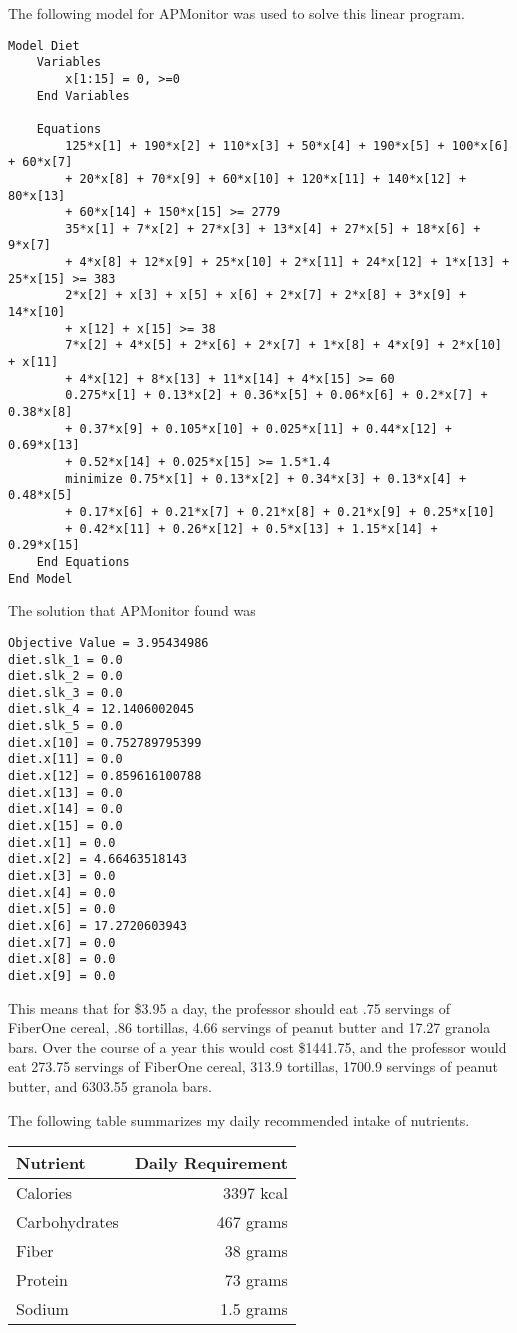 \documentclass[11pt, oneside]{article}
\begin{document}
\noindent The following model for APMonitor was used to solve this linear program.

\begin{verbatim}
Model Diet
    Variables
        x[1:15] = 0, >=0
    End Variables

    Equations
        125*x[1] + 190*x[2] + 110*x[3] + 50*x[4] + 190*x[5] + 100*x[6] + 60*x[7]
        + 20*x[8] + 70*x[9] + 60*x[10] + 120*x[11] + 140*x[12] + 80*x[13]
        + 60*x[14] + 150*x[15] >= 2779
        35*x[1] + 7*x[2] + 27*x[3] + 13*x[4] + 27*x[5] + 18*x[6] + 9*x[7]
        + 4*x[8] + 12*x[9] + 25*x[10] + 2*x[11] + 24*x[12] + 1*x[13] + 25*x[15] >= 383
        2*x[2] + x[3] + x[5] + x[6] + 2*x[7] + 2*x[8] + 3*x[9] + 14*x[10]
        + x[12] + x[15] >= 38
        7*x[2] + 4*x[5] + 2*x[6] + 2*x[7] + 1*x[8] + 4*x[9] + 2*x[10] + x[11]
        + 4*x[12] + 8*x[13] + 11*x[14] + 4*x[15] >= 60
        0.275*x[1] + 0.13*x[2] + 0.36*x[5] + 0.06*x[6] + 0.2*x[7] + 0.38*x[8]
        + 0.37*x[9] + 0.105*x[10] + 0.025*x[11] + 0.44*x[12] + 0.69*x[13]
        + 0.52*x[14] + 0.025*x[15] >= 1.5*1.4
        minimize 0.75*x[1] + 0.13*x[2] + 0.34*x[3] + 0.13*x[4] + 0.48*x[5]
        + 0.17*x[6] + 0.21*x[7] + 0.21*x[8] + 0.21*x[9] + 0.25*x[10]
        + 0.42*x[11] + 0.26*x[12] + 0.5*x[13] + 1.15*x[14] + 0.29*x[15]
    End Equations
End Model
\end{verbatim}

\noindent The solution that APMonitor found was
\begin{verbatim}
Objective Value = 3.95434986
diet.slk_1 = 0.0
diet.slk_2 = 0.0
diet.slk_3 = 0.0
diet.slk_4 = 12.1406002045
diet.slk_5 = 0.0
diet.x[10] = 0.752789795399
diet.x[11] = 0.0
diet.x[12] = 0.859616100788
diet.x[13] = 0.0
diet.x[14] = 0.0
diet.x[15] = 0.0
diet.x[1] = 0.0
diet.x[2] = 4.66463518143
diet.x[3] = 0.0
diet.x[4] = 0.0
diet.x[5] = 0.0
diet.x[6] = 17.2720603943
diet.x[7] = 0.0
diet.x[8] = 0.0
diet.x[9] = 0.0
\end{verbatim}

This means that for \$3.95 a day, the professor should eat .75 servings of
FiberOne cereal, .86 tortillas, 4.66 servings of peanut butter and 17.27 granola bars.
Over the course of a year this would cost \$1441.75, and the professor would eat
273.75 servings of FiberOne cereal, 313.9 tortillas, 1700.9 servings of peanut
butter, and 6303.55 granola bars.

The following table summarizes my daily recommended intake of nutrients.
\begin{center}
    \begin{tabular}{lr}
        \toprule
        Nutrient      & Daily Requirement \\
        \midrule
        Calories      & 3397 kcal \\
        Carbohydrates & 467 grams  \\
        Fiber         & 38 grams \\
        Protein       & 73 grams \\
        Sodium        & 1.5 grams \\
        \bottomrule
    \end{tabular}
\end{center}
\end{document}
